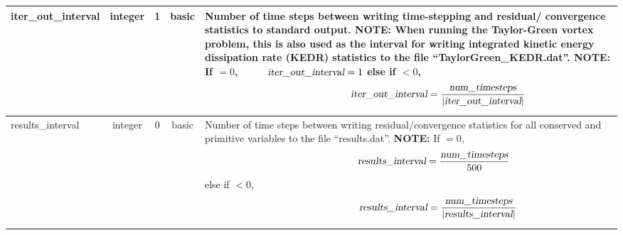 \documentclass[letterpaper,10pt]{article}
\newcommand{\slbsc}{basic}
\newcommand{\typint}{integer}
\newcommand{\minorline}{\hline}
\newcommand{\groupline}[1]{}
\newlength{\colEwidth}
\newcommand{\descriptionbegin}{}
\newcommand{\descriptionend}{\\ \minorline}
\newcommand{\NOTE}{\newline \textcolor{OrangeRed3}{\textbf{NOTE: }}}
\begin{document}
\begin{longtable}{ | l | c | c | c | p{\colEwidth} | }
    \groupline{STATISTICAL OUTPUT OPTIONS}
    iter\_out\_interval & \typint & 1 & \slbsc &
    \descriptionbegin
    Number of time steps between writing time-stepping and residual\slash
    convergence statistics to standard output. \NOTE When running the
    Taylor-Green vortex problem, this is also used as the interval for writing
    integrated kinetic energy dissipation rate (KEDR) statistics to the file
    ``TaylorGreen\_KEDR.dat''.
    \NOTE If $= 0$, $\qquad\;\;\textsl{iter\_out\_interval} = 1$ 
    \setlength{\abovedisplayskip}{-8pt}
    \setlength{\parindent}{\widthof{NOTE: }}
    \newline \indent else if $< 0$, \[\qquad\qquad\qquad
    \textsl{iter\_out\_interval} =
    \frac{\textsl{num\_timesteps}}{\left|\textsl{iter\_out\_interval}\right|}\]
    \setlength{\parindent}{0pt}
    \setlength{\abovedisplayskip}{4pt}
    \descriptionend
    results\_interval   & \typint & 0 & \slbsc &
    \descriptionbegin
    Number of time steps between writing residual\slash convergence statistics
    for all conserved and primitive variables to the file ``results.dat''.
    \setlength{\abovedisplayskip}{-8pt}
    \setlength{\belowdisplayskip}{0pt}
    \NOTE If $= 0$, \[\qquad\qquad\;\;\;\;\textsl{results\_interval} =
    \frac{\textsl{num\_timesteps}}{500}\]
    \setlength{\belowdisplayskip}{4pt}
    \setlength{\parindent}{\widthof{NOTE: }}
    \newline \indent else if $< 0$, \[\qquad\qquad\qquad
    \textsl{results\_interval} =
    \frac{\textsl{num\_timesteps}}{\left|\textsl{results\_interval}\right|}\]
    \setlength{\parindent}{0pt}
    \setlength{\abovedisplayskip}{4pt}
    \descriptionend


\end{longtable}
\end{document}
